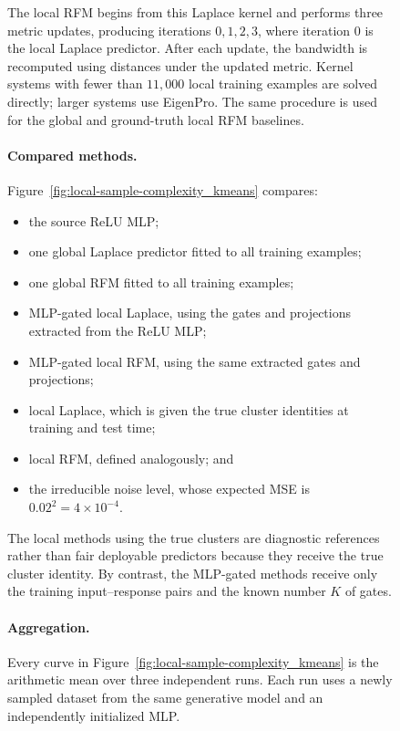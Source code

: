\documentclass{article}
\newcounter{model}[section]
\begin{document}
\begin{figure}
The local RFM begins from this Laplace kernel and performs three metric
updates, producing iterations \(0,1,2,3\), where iteration \(0\) is the local
Laplace predictor. After each update, the bandwidth is recomputed using
distances under the updated metric. Kernel systems with fewer than
\(11{,}000\) local training examples are solved directly; larger systems use
EigenPro. The same procedure is used for the global and ground-truth local
RFM baselines.

\paragraph{Compared methods.}
Figure~\ref{fig:local-sample-complexity_kmeans} compares:

\begin{itemize}
    \item the source ReLU MLP;
    \item one global Laplace predictor fitted to all training examples;
    \item one global RFM fitted to all training examples;
    \item MLP-gated local Laplace, using the gates and projections extracted
    from the ReLU MLP;
    \item MLP-gated local RFM, using the same extracted gates and projections;
    \item local Laplace, which is given the true cluster identities at
    training and test time;
    \item local RFM, defined analogously; and
    \item the irreducible noise level, whose expected MSE is
    \(0.02^2=4\times10^{-4}\).
\end{itemize}

The local methods using the true clusters are diagnostic references rather
than fair deployable predictors because they receive the true cluster
identity. By contrast, the
MLP-gated methods receive only the training input--response pairs and the
known number \(K\) of gates.





\paragraph{Aggregation.}
Every curve in Figure~\ref{fig:local-sample-complexity_kmeans} is the
arithmetic mean over three independent runs. Each run uses a newly sampled
dataset from the same generative model and an independently initialized MLP.



\end{figure}
\end{document}

